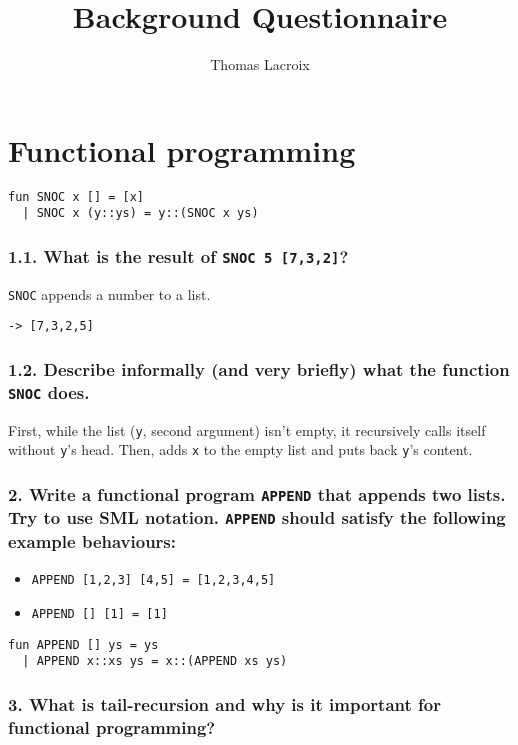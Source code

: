 \documentclass[10pt,a4paper]{article}
\title{Background Questionnaire}
\author{Thomas Lacroix}
\begin{document}
\maketitle

\section{Functional programming}

\begin{verbatim}
fun SNOC x [] = [x]
  | SNOC x (y::ys) = y::(SNOC x ys)
\end{verbatim}

\subsubsection*{1.1. What is the result of \texttt{SNOC 5 [7,3,2]}?}

\texttt{SNOC} appends a number to a list.
\begin{verbatim}
-> [7,3,2,5]
\end{verbatim}

\subsubsection*{1.2. Describe informally (and very briefly) what the function \texttt{SNOC} does.}

First, while the list (\texttt{y}, second argument) isn't empty, it recursively calls itself without \texttt{y}'s head. Then, adds \texttt{x} to the empty list and puts back \texttt{y}'s content.

\subsubsection*{2. Write a functional program \texttt{APPEND} that appends two lists. Try to use SML notation. \texttt{APPEND} should satisfy the following example behaviours:}

\begin{itemize}
\item \texttt{APPEND [1,2,3] [4,5] = [1,2,3,4,5]}
\item \texttt{APPEND [] [1] = [1]}
\end{itemize}

\begin{verbatim}
fun APPEND [] ys = ys
  | APPEND x::xs ys = x::(APPEND xs ys)
\end{verbatim}

\subsubsection*{3. What is tail-recursion and why is it important for functional programming?}
\end{document}

